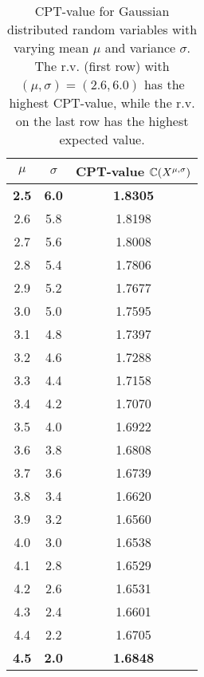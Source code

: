 \begin{table}
\centering
\begin{tabular}{|c|c|c|}
\toprule
$\mu$ & $\sigma$ & CPT-value $\mathbb{C}(X^{\mu,\sigma})$\\
\midrule
\textbf{2.5} & \textbf{6.0} & \textbf{1.8305}\\
2.6 & 5.8 & 1.8198\\
2.7 & 5.6 & 1.8008\\
2.8 & 5.4 & 1.7806\\
2.9 & 5.2 & 1.7677\\
3.0 & 5.0 & 1.7595\\
3.1 & 4.8 & 1.7397\\
3.2 & 4.6 & 1.7288\\
3.3 & 4.4 & 1.7158\\
3.4 & 4.2 & 1.7070\\
3.5 & 4.0 & 1.6922\\
3.6 & 3.8 & 1.6808\\
3.7 & 3.6 & 1.6739\\
3.8 & 3.4 & 1.6620\\
3.9 & 3.2 & 1.6560\\
4.0 & 3.0 & 1.6538\\
4.1 & 2.8 & 1.6529\\
4.2 & 2.6 & 1.6531\\
4.3 & 2.4 & 1.6601\\
4.4 & 2.2 & 1.6705\\
\textbf{4.5} & \textbf{2.0} & \textbf{1.6848}\\
\bottomrule
\end{tabular}
\caption{CPT-value for Gaussian distributed random variables with varying mean $\mu$ and variance $\sigma$. The r.v. (first row) with $(\mu,\sigma)=(2.6,6.0)$ has the highest CPT-value, while the r.v. on the last row has the highest expected value.}
\label{tab:gaussCPT}
\end{table}

